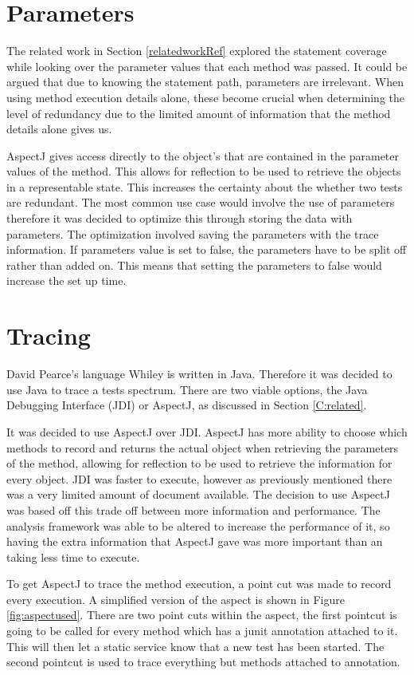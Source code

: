 \section{Parameters}

The related work in Section \ref{relatedworkRef} explored the statement coverage while looking over the parameter values that each method was passed. It could be argued that due to knowing the statement path, parameters are irrelevant. When using method execution details alone, these become crucial when determining the level of redundancy due to the limited amount of information that the method details alone gives us. 

AspectJ gives access directly to the object's that are contained in the parameter values of the method. This allows for reflection to be used to retrieve the objects in a representable state. This increases the certainty about the whether two tests are redundant. The most common use case would involve the use of parameters therefore it was decided to optimize this through storing the data with parameters. The optimization involved saving the parameters with the trace information. If parameters value is set to false, the parameters have to be split off rather than added on. This means that setting the parameters to false would increase the set up time.

\section{Tracing}
\label{S:trace}

David Pearce's language Whiley is written in Java. Therefore it was decided to use Java to trace a tests spectrum. There are two viable options, the Java Debugging Interface (JDI) or AspectJ, as discussed in Section \ref{C:related}. 

It was decided to use AspectJ over JDI. AspectJ has more ability to choose which methods to record and returns the actual object when retrieving the parameters of the method, allowing for reflection to be used to retrieve the information for every object. JDI was faster to execute, however as previously mentioned there was a very limited amount of document available. The decision to use AspectJ was based off this trade off between more information and performance. The analysis framework was able to be altered to increase the performance of it, so having the extra information that AspectJ gave was more important than an taking less time to execute.

To get AspectJ to trace the method execution, a point cut was made to record every execution. A simplified version of the aspect is shown in Figure \ref{fig:aspectused}. There are two point cuts within the aspect, the first pointcut is going to be called for every method which has a junit \@Test annotation attached to it. This will then let a static service know that a new test has been started. The second pointcut is used to trace everything but methods attached to \@Test annotation. 

